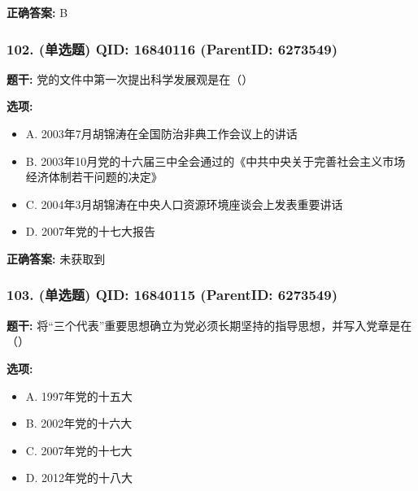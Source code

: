 \documentclass[12pt,UTF8]{ctexart}
\begin{document}
\textbf{正确答案:}
B

\vspace{0.3em}\hrulefill\vspace{0.7em}

\subsubsection*{102. (单选题) \small QID: 16840116 (ParentID: 6273549)}

\textbf{题干:}
党的文件中第一次提出科学发展观是在（）



\textbf{选项:}
\begin{itemize}[leftmargin=*]

  \item A. 2003年7月胡锦涛在全国防治非典工作会议上的讲话

  \item B. 2003年10月党的十六届三中全会通过的《中共中央关于完善社会主义市场经济体制若干问题的决定》

  \item C. 2004年3月胡锦涛在中央人口资源环境座谈会上发表重要讲话

  \item D. 2007年党的十七大报告

\end{itemize}

\textbf{正确答案:}
未获取到

\vspace{0.3em}\hrulefill\vspace{0.7em}

\subsubsection*{103. (单选题) \small QID: 16840115 (ParentID: 6273549)}

\textbf{题干:}
将“三个代表”重要思想确立为党必须长期坚持的指导思想，并写入党章是在（）



\textbf{选项:}
\begin{itemize}[leftmargin=*]

  \item A. 1997年党的十五大

  \item B. 2002年党的十六大

  \item C. 2007年党的十七大

  \item D. 2012年党的十八大

\end{itemize}
\end{document}
